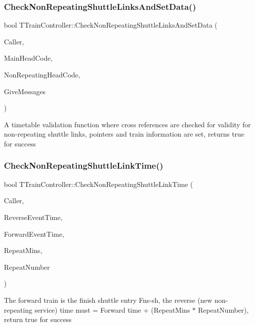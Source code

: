 \subsubsection{\texorpdfstring{Check\+Non\+Repeating\+Shuttle\+Links\+And\+Set\+Data()}{CheckNonRepeatingShuttleLinksAndSetData()}}
{\footnotesize\ttfamily bool T\+Train\+Controller\+::\+Check\+Non\+Repeating\+Shuttle\+Links\+And\+Set\+Data (\begin{DoxyParamCaption}\item[{int}]{Caller,  }\item[{Ansi\+String}]{Main\+Head\+Code,  }\item[{Ansi\+String}]{Non\+Repeating\+Head\+Code,  }\item[{bool}]{Give\+Messages }\end{DoxyParamCaption})}

A timetable validation function where cross references are checked for validity for non-\/repeating shuttle links, pointers and train information are set, returns true for success \mbox{\label{class_t_train_controller_a45168500acc985a1573602e0c00a0d9a}} 
\subsubsection{\texorpdfstring{Check\+Non\+Repeating\+Shuttle\+Link\+Time()}{CheckNonRepeatingShuttleLinkTime()}}
{\footnotesize\ttfamily bool T\+Train\+Controller\+::\+Check\+Non\+Repeating\+Shuttle\+Link\+Time (\begin{DoxyParamCaption}\item[{int}]{Caller,  }\item[{T\+Date\+Time}]{Reverse\+Event\+Time,  }\item[{T\+Date\+Time}]{Forward\+Event\+Time,  }\item[{int}]{Repeat\+Mins,  }\item[{int}]{Repeat\+Number }\end{DoxyParamCaption})}

The forward train is the finish shuttle entry \textquotesingle{}Fns-\/sh\textquotesingle{}, the reverse (new non-\/repeating service) time must = Forward time + (Repeat\+Mins $\ast$ Repeat\+Number), return true for success \mbox{\label{class_t_train_controller_a161fe7b4bbf101fc0a3f7eadd3aff9ca}} 
